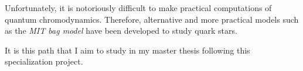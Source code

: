 Unfortunately, it is notoriously difficult to make practical computations of quantum chromodynamics.
Therefore, alternative and more practical models such as the \emph{MIT bag model} have been developed to study quark stars.

It is this path that I aim to study in my master thesis following this specialization project.

